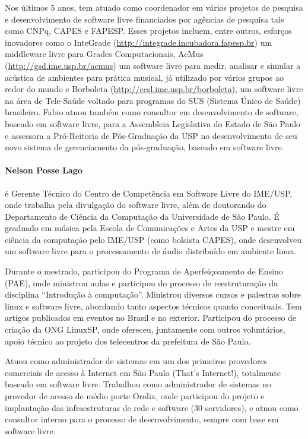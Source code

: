 Nos últimos 5 anos, tem atuado como coordenador em vários projetos de
pesquisa e desenvolvimento de software livre financiados por agências
de pesquisa tais como CNPq, CAPES e FAPESP.
%
Esses projetos incluem, entre outros, esforços inovadores como o
InteGrade (\url{http://integrade.incubadora.fapesp.br}) um middleware
livre para Grades Computacionais, AcMus
(\url{http://gsd.ime.usp.br/acmus}) um software livre para medir,
analisar e simular a acústica de ambientes para prática musical, já
utilizado por vários grupos ao redor do mundo e Borboleta
(\url{http://ccsl.ime.usp.br/borboleta}), um software livre na área de
Tele-Saúde voltado para programas do SUS (Sistema Único de Saúde)
brasileiro.
%
Fabio atuou também como consultor em desenvolvimento de software,
baseado em software livre, para a Assembleia Legislativa do Estado de
São Paulo e assessora a Pró-Reitoria de Pós-Graduação da USP no
desenvolvimento de seu novo sistema de gerenciamento da pós-graduação,
baseado em software livre.


\paragraph{Nelson Posse Lago}

é Gerente Técnico do Centro de Competência em Software Livre do
IME/USP, onde trabalha pela divulgação do software livre, além de
doutorando do Departamento de Ciência da Computação da Universidade de
São Paulo.
%
É graduado em música pela Escola de Comunicações e Artes da USP e
mestre em ciência da computação pelo IME/USP (como bolsista CAPES),
onde desenvolveu um software livre para o processamento de áudio
distribuído em ambiente linux.

Durante o mestrado, participou do Programa de Aperfeiçoamento de
Ensino (PAE), onde ministrou aulas e participou do processo de
reestruturação da disciplina ``Introdução à computação''.
%
Ministrou diversos cursos e palestras sobre linux e software livre,
abordando tanto aspectos técnicos quanto conceituais.
%
Tem artigos publicados em eventos no Brasil e no exterior.
%
Participou do processo de criação da ONG
\textquotedbl{}LinuxSP\textquotedbl{}, onde ofereceu, juntamente com
outros voluntários, apoio técnico ao projeto dos telecentros da
prefeitura de São Paulo.

Atuou como administrador de sistemas em um dos primeiros provedores
comerciais de acesso à Internet em São Paulo (That's Internet!),
totalmente baseado em software livre.
%
Trabalhou como administrador de sistemas no provedor de acesso de
médio porte Orolix, onde participou do projeto e implantação das
infraestruturas de rede e software (30 servidores), e atuou como
consultor interno para o processo de desenvolvimento, sempre com base
em software livre. 


